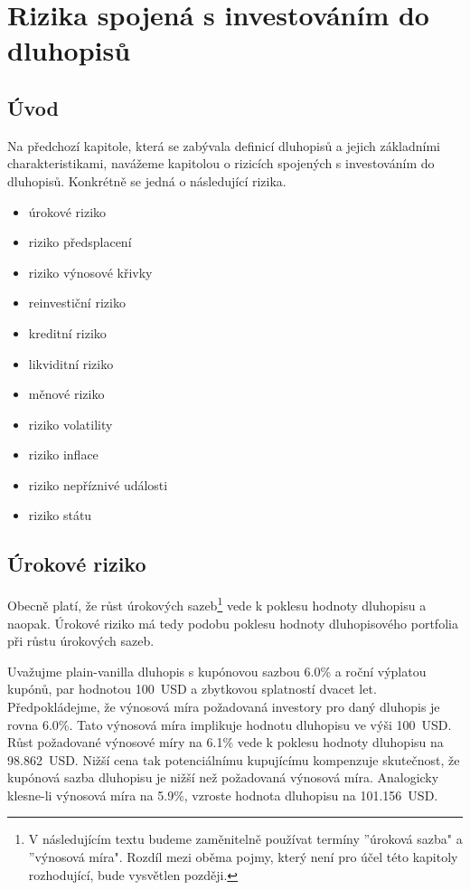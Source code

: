 \documentclass[a4paper]{book}
\begin{document}
\chapter{Rizika spojená s investováním do dluhopisů}

\section{Úvod}

Na předchozí kapitole, která se zabývala definicí dluhopisů a jejich základními charakteristikami, navážeme kapitolou o rizicích spojených s investováním do dluhopisů. Konkrétně se jedná o následující rizika.
\begin{itemize}
\item úrokové riziko
\item riziko předsplacení
\item riziko výnosové křivky
\item reinvestiční riziko
\item kreditní riziko
\item likviditní riziko
\item měnové riziko
\item riziko volatility
\item riziko inflace
\item riziko nepříznivé události
\item riziko státu
\end{itemize}

\section{Úrokové riziko}

Obecně platí, že růst úrokových sazeb\footnote{V následujícím textu budeme zaměnitelně používat termíny ''úroková sazba" a ''výnosová míra". Rozdíl mezi oběma pojmy, který není pro účel této kapitoly rozhodující, bude vysvětlen později.} vede k poklesu hodnoty dluhopisu a naopak. Úrokové riziko má tedy podobu poklesu hodnoty dluhopisového portfolia při růstu úrokových sazeb.

Uvažujme plain-vanilla dluhopis s kupónovou sazbou 6.0\% a roční výplatou kupónů, par hodnotou 100~USD a zbytkovou splatností dvacet let. Předpokládejme, že výnosová míra požadovaná investory pro daný dluhopis je rovna 6.0\%. Tato výnosová míra implikuje hodnotu dluhopisu ve výši 100~USD. Růst požadované výnosové míry na 6.1\% vede k poklesu hodnoty dluhopisu na 98.862~USD. Nižší cena tak potenciálnímu kupujícímu kompenzuje skutečnost, že kupónová sazba dluhopisu je nižší než požadovaná výnosová míra. Analogicky klesne-li výnosová míra na 5.9\%, vzroste hodnota dluhopisu na 101.156~USD.
\end{document}
